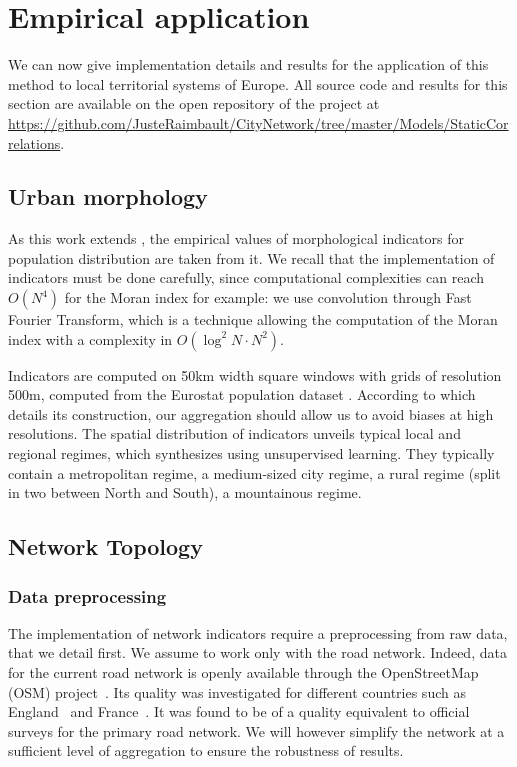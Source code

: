\documentclass[11pt]{article}
\begin{document}
\section{Empirical application}

We can now give implementation details and results for the application of this method to local territorial systems of Europe. All source code and results for this section are available on the open repository of the project at \url{https://github.com/JusteRaimbault/CityNetwork/tree/master/Models/StaticCorrelations}.

\subsection{Urban morphology}

As this work extends \cite{2017arXiv170806743R}, the empirical values of morphological indicators for population distribution are taken from it. We recall that the implementation of indicators must be done carefully, since computational complexities can reach $O(N^4)$ for the Moran index for example: we use convolution through Fast Fourier Transform, which is a technique allowing the computation of the Moran index with a complexity in $O(\log^2 N \cdot N^2)$.

Indicators are computed on 50km width square windows with grids of resolution 500m, computed from the Eurostat population dataset \citep{eurostat}. According to \cite{batista2013high} which details its construction, our aggregation should allow us to avoid biases at high resolutions. The spatial distribution of indicators unveils typical local and regional regimes, which \cite{2017arXiv170806743R} synthesizes using unsupervised learning. They typically contain a metropolitan regime, a medium-sized city regime, a rural regime (split in two between North and South), a mountainous regime.



\subsection{Network Topology}

\subsubsection{Data preprocessing}

The implementation of network indicators require a preprocessing from raw data, that we detail first. We assume to work only with the road network. Indeed, data for the current road network is openly available through the OpenStreetMap (OSM) project~\citep{openstreetmap}. Its quality was investigated for different countries such as England~\citep{haklay2010good} and France~\citep{girres2010quality}. It was found to be of a quality equivalent to official surveys for the primary road network. We will however simplify the network at a sufficient level of aggregation to ensure the robustness of results.
\end{document}
